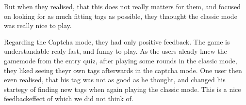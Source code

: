 But when they realised, that this does not really matters for them, and focused on looking for as much fitting tags as possible, they thaought the classic mode was really nice to play.

Regarding the Captcha mode, they had only positive feedback. The game is understandable realy fast, and funny to play.
As the users aleady knew the gamemode from the entry quiz, after playing some rounds in the classic mode, they liked seeing theyr own tags afterwards in the captcha mode.
One user then even realised, that his tag was not as good as he thought, and changed his startegy of finding new tags when again playing the classic mode.
This is a nice feedback\-effect of which we did not think of.